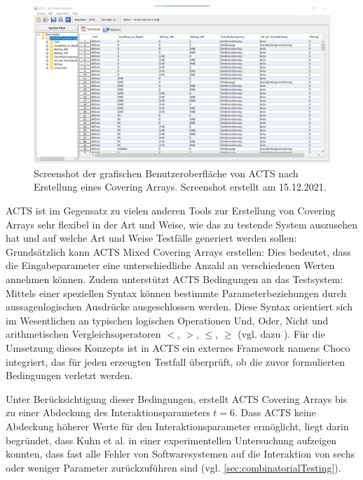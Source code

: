 \begin{figure}[!htb]
\centering
\includegraphics[width=0.8\columnwidth]{images/Screenshot_ACTS.jpg}
\caption{Screenshot der grafischen Benutzeroberfläche von ACTS nach Erstellung eines Covering Arrays. Screenshot erstellt am 15.12.2021.}
\label{fig:acts}
\end{figure}

ACTS ist im Gegensatz zu vielen anderen Tools zur Erstellung von Covering Arrays sehr flexibel in der Art und Weise, wie das zu testende System auszusehen hat und auf welche Art und Weise Testfälle generiert werden sollen: Grundsätzlich kann ACTS Mixed Covering Arrays erstellen: Dies bedeutet, dass die Eingabeparameter eine unterschiedliche Anzahl an verschiedenen Werten annehmen können. Zudem unterstützt ACTS Bedingungen an das Testsystem: Mittels einer speziellen Syntax können bestimmte Parameterbeziehungen durch aussagenlogischen Ausdrücke ausgeschlossen werden. Diese Syntax orientiert sich im Wesentlichen an typischen logischen Operationen \glqq Und\grqq{}, \glqq Oder\grqq{}, \glqq Nicht\grqq{} und arithmetischen Vergleichsoperatoren \glqq $<$\grqq{}, \glqq $>$\grqq{}, \glqq $\leq$\grqq{}, \glqq $\geq$\grqq{} (vgl. dazu \cite{yu2013acts}). Für die Umsetzung dieses Konzepts ist in ACTS ein externes Framework namens Choco \cite{solver} integriert, das für jeden erzeugten Testfall überprüft, ob die zuvor formulierten Bedingungen verletzt werden.

Unter Berücksichtigung dieser Bedingungen, erstellt ACTS Covering Arrays bis zu einer Abdeckung des Interaktionsparameters $t = 6$. Dass ACTS keine Abdeckung höherer Werte für den Interaktionsparameter ermöglicht, liegt darin begründet, dass Kuhn et al. \cite{kuhn2004error} in einer experimentellen Untersuchung aufzeigen konnten, dass fast alle Fehler von Softwaresystemen auf die Interaktion von sechs oder weniger Parameter zurückzuführen sind (vgl. \autoref{sec:combinatorialTesting}). 


